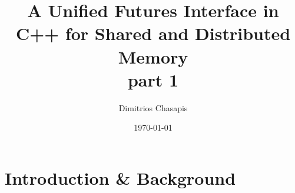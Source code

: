 \documentclass[svgnames]{beamer}
\title{\Large \bf
A Unified Futures Interface in C++ for Shared and Distributed Memory\\
part 1}
\author[\tiny \thepage /28]{Dimitrios Chasapis}
\institute{PARSYS - LRI}
\date{\today}
\begin{document}

\frame[plain]{\titlepage}
\setcounter{framenumber}{0}

\section{Introduction \& Background}
\end{document}
